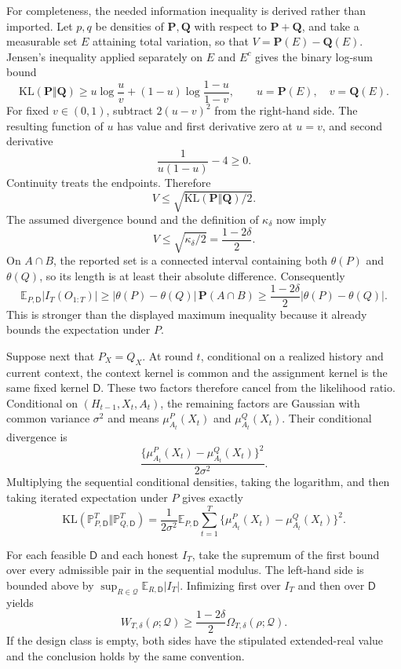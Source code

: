 For completeness, the needed information inequality is derived rather than imported.  Let \(p,q\) be densities of \(\mathbf P,\mathbf Q\) with respect to \(\mathbf P+\mathbf Q\), and take a measurable set \(E\) attaining total variation, so that \(V=\mathbf P(E)-\mathbf Q(E)\).  Jensen's inequality applied separately on \(E\) and \(E^c\) gives the binary log-sum bound
\[
\mathrm{KL}(\mathbf P\Vert\mathbf Q)
\geq u\log\frac uv+(1-u)\log\frac{1-u}{1-v},
\qquad
u=\mathbf P(E),\quad v=\mathbf Q(E).
\]
For fixed \(v\in(0,1)\), subtract \(2(u-v)^2\) from the right-hand side.  The resulting function of \(u\) has value and first derivative zero at \(u=v\), and second derivative
\[
\frac{1}{u(1-u)}-4\geq0.
\]
Continuity treats the endpoints.  Therefore
\[
V\leq\sqrt{\mathrm{KL}(\mathbf P\Vert\mathbf Q)/2}.
\]
The assumed divergence bound and the definition of \(\kappa_\delta\) now imply
\[
V\leq\sqrt{\kappa_\delta/2}=\frac{1-2\delta}{2}.
\]
On \(A\cap B\), the reported set is a connected interval containing both \(\theta(P)\) and \(\theta(Q)\), so its length is at least their absolute difference.  Consequently
\[
\mathbb E_{P,\mathsf D}|I_T(O_{1:T})|
\geq |\theta(P)-\theta(Q)|\,\mathbf P(A\cap B)
\geq\frac{1-2\delta}{2}|\theta(P)-\theta(Q)|.
\]
This is stronger than the displayed maximum inequality because it already bounds the expectation under \(P\).

Suppose next that \(P_X=Q_X\).  At round \(t\), conditional on a realized history and current context, the context kernel is common and the assignment kernel is the same fixed kernel \(\mathsf D\).  These two factors therefore cancel from the likelihood ratio.  Conditional on \((H_{t-1},X_t,A_t)\), the remaining factors are Gaussian with common variance \(\sigma^2\) and means \(\mu_{A_t}^P(X_t)\) and \(\mu_{A_t}^Q(X_t)\).  Their conditional divergence is
\[
\frac{\{\mu_{A_t}^P(X_t)-\mu_{A_t}^Q(X_t)\}^2}{2\sigma^2}.
\]
Multiplying the sequential conditional densities, taking the logarithm, and then taking iterated expectation under \(P\) gives exactly
\[
\mathrm{KL}(\mathbb P_{P,\mathsf D}^{T}\Vert\mathbb P_{Q,\mathsf D}^{T})
=\frac{1}{2\sigma^2}\mathbb E_{P,\mathsf D}
\sum_{t=1}^T\{\mu_{A_t}^P(X_t)-\mu_{A_t}^Q(X_t)\}^2.
\]

For each feasible \(\mathsf D\) and each honest \(I_T\), take the supremum of the first bound over every admissible pair in the sequential modulus.  The left-hand side is bounded above by \(\sup_{R\in\mathcal Q}\mathbb E_{R,\mathsf D}|I_T|\).  Infimizing first over \(I_T\) and then over \(\mathsf D\) yields
\[
W_{T,\delta}(\rho;\mathcal Q)
\geq\frac{1-2\delta}{2}\Omega_{T,\delta}(\rho;\mathcal Q).
\]
If the design class is empty, both sides have the stipulated extended-real value and the conclusion holds by the same convention.

